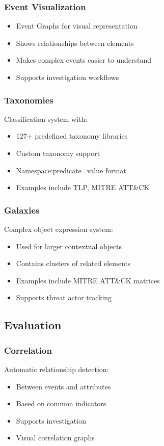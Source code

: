 \subsubsection{Event Visualization}
\begin{itemize}
    \item Event Graphs for visual representation
    \item Shows relationships between elements
    \item Makes complex events easier to understand
    \item Supports investigation workflows
\end{itemize}

\subsubsection{Taxonomies}
Classification system with:
\begin{itemize}
    \item 127+ predefined taxonomy libraries
    \item Custom taxonomy support
    \item Namespace:predicate=value format
    \item Examples include TLP, MITRE ATT\&CK
\end{itemize}

\subsubsection{Galaxies}
Complex object expression system:
\begin{itemize}
    \item Used for larger contextual objects
    \item Contains clusters of related elements
    \item Examples include MITRE ATT\&CK matrices
    \item Supports threat actor tracking
\end{itemize}

\subsection{Evaluation}

\subsubsection{Correlation}
Automatic relationship detection:
\begin{itemize}
    \item Between events and attributes
    \item Based on common indicators
    \item Supports investigation
    \item Visual correlation graphs
\end{itemize}


